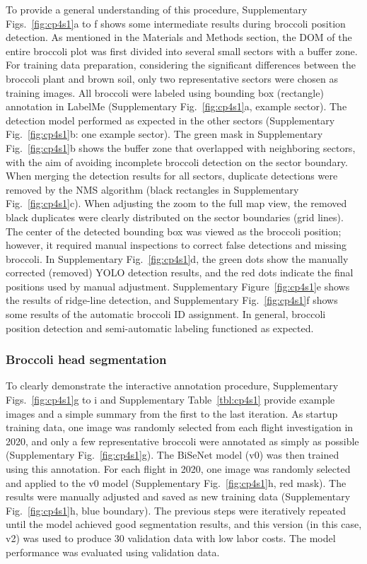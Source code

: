 To provide a general understanding of this procedure, Supplementary Figs.~\ref{fig:cp4s1}a to f shows some intermediate results during broccoli position detection. As mentioned in the Materials and Methods section, the DOM of the entire broccoli plot was first divided into several small sectors with a buffer zone. For training data preparation, considering the significant differences between the broccoli plant and brown soil, only two representative sectors were chosen as training images. All broccoli were labeled using bounding box (rectangle) annotation in LabelMe (Supplementary Fig.~\ref{fig:cp4s1}a, example sector). The detection model performed as expected in the other sectors (Supplementary Fig.~\ref{fig:cp4s1}b: one example sector). The green mask in Supplementary Fig.~\ref{fig:cp4s1}b shows the buffer zone that overlapped with neighboring sectors, with the aim of avoiding incomplete broccoli detection on the sector boundary. When merging the detection results for all sectors, duplicate detections were removed by the NMS algorithm (black rectangles in Supplementary Fig.~\ref{fig:cp4s1}c). When adjusting the zoom to the full map view, the removed black duplicates were clearly distributed on the sector boundaries (grid lines). The center of the detected bounding box was viewed as the broccoli position; however, it required manual inspections to correct false detections and missing broccoli. In Supplementary Fig.~\ref{fig:cp4s1}d, the green dots show the manually corrected (removed) YOLO detection results, and the red dots indicate the final positions used by manual adjustment. Supplementary Figure~\ref{fig:cp4s1}e shows the results of ridge-line detection, and Supplementary Fig.~\ref{fig:cp4s1}f shows some results of the automatic broccoli ID assignment. In general, broccoli position detection and semi-automatic labeling functioned as expected.

\subsubsection*{Broccoli head segmentation}

To clearly demonstrate the interactive annotation procedure, Supplementary \linebreak Figs.~\ref{fig:cp4s1}g to i and Supplementary Table~\ref{tbl:cp4s1} provide example images and a simple summary from the first to the last iteration. As startup training data, one image was randomly selected from each flight investigation in 2020, and only a few representative broccoli were annotated as simply as possible (Supplementary Fig.~\ref{fig:cp4s1}g). The BiSeNet model (v0) was then trained using this annotation. For each flight in 2020, one image was randomly selected and applied to the v0 model (Supplementary Fig.~\ref{fig:cp4s1}h, red mask). The results were manually adjusted and saved as new training data (Supplementary Fig.~\ref{fig:cp4s1}h, blue boundary). The previous steps were iteratively repeated until the model achieved good segmentation results, and this version (in this case, v2) was used to produce 30 validation data with low labor costs. The model performance was evaluated using validation data.

